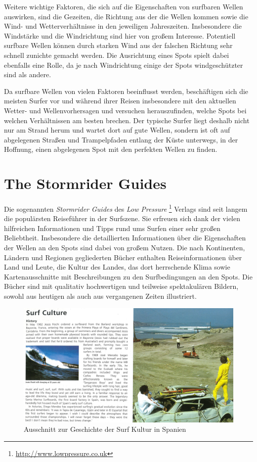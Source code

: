 Weitere wichtige Faktoren, die sich auf die Eigenschaften von
surfbaren Wellen auswirken, sind die Gezeiten, die Richtung aus der
die Wellen kommen sowie die Wind- und Wetterverhältnisse in den
jeweiligen Jahreszeiten. Insbesondere die Windstärke und die
Windrichtung sind hier von großem Interesse. Potentiell surfbare
Wellen können durch starken Wind aus der falschen Richtung sehr
schnell zunichte gemacht werden. Die Ausrichtung eines Spots spielt
dabei ebenfalls eine Rolle, da je nach Windrichtung einige der Spots
windgeschützter sind als andere.

Da surfbare Wellen von vielen Faktoren beeinflusst werden,
beschäftigen sich die meisten Surfer vor und während ihrer Reisen
insbesondere mit den aktuellen Wetter- und Wellenvorhersagen und
versuchen herauszufinden, welche Spots bei welchen Verhältnissen am
besten brechen. Der typische Surfer liegt deshalb nicht nur am Strand
herum und wartet dort auf gute Wellen, sondern ist oft auf abgelegenen
Straßen und Trampelpfaden entlang der Küste unterwegs, in der
Hoffnung, einen abgelegenen Spot mit den perfekten Wellen zu finden.

\section{The Stormrider Guides}
Die sogenannten \textit{Stormrider Guides} des \textit{Low Pressure}
\footnote{\url{http://www.lowpressure.co.uk}} Verlags sind seit langem
die populärsten Reiseführer in der Surfszene. Sie erfreuen sich dank
der vielen hilfreichen Informationen und Tipps rund ums Surfen einer
sehr großen Beliebtheit. Insbesondere die detaillierten Informationen
über die Eigenschaften der Wellen an den Spots sind dabei von großem
Nutzen. Die nach Kontinenten, Ländern und Regionen gegliederten Bücher
enthalten Reiseinformationen über Land und Leute, die Kultur des
Landes, das dort herrschende Klima sowie Kartenausschnitte mit
Beschreibungen zu den Surfbedingungen an den Spots. Die Bücher sind
mit qualitativ hochwertigen und teilweise spektakulären Bildern,
sowohl aus heutigen als auch aus vergangenen Zeiten illustriert.

\begin{figure}[h]
  \includegraphics[width=\textwidth]{bilder/surf-culture}
  \caption{Ausschnitt zur Geschichte der Surf Kultur in Spanien}
  \label{surf-culture}
\end{figure}

